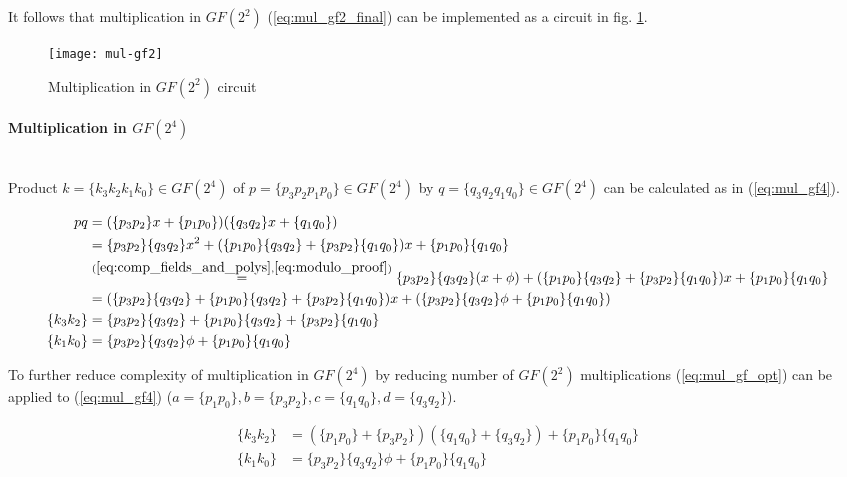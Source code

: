 It follows that multiplication in $GF(2^2)$ (\ref{eq:mul_gf2_final}) can be implemented as a circuit in fig. \ref{fig:mul_gf2}.

\begin{figure}[!h]
\centering
\texttt{[image: mul-gf2]}
\caption{Multiplication in $GF(2^2)$ circuit}
\label{fig:mul_gf2}
\end{figure}



\paragraph{Multiplication in $GF(2^4)$}\mbox{}\\
Product $k = \{k_3k_2k_1k_0\} \in GF(2^4)$ of $p = \{p_3p_2p_1p_0\} \in GF(2^4)$ by $q = \{q_3q_2q_1q_0\} \in GF(2^4)$ can be calculated as in (\ref{eq:mul_gf4}).

\begin{equation}
\label{eq:mul_gf4}
\begin{aligned}
pq &= (\{p_3p_2\}x + \{p_1p_0\})(\{q_3q_2\}x + \{q_1q_0\})\\
&= \{p_3p_2\}\{q_3q_2\}x^2 + (\{p_1p_0\}\{q_3q_2\} + \{p_3p_2\}\{q_1q_0\})x + \{p_1p_0\}\{q_1q_0\} \\
&\stackrel{(\ref{eq:comp_fields_and_polys}, \ref{eq:modulo_proof})}{=}
\{p_3p_2\}\{q_3q_2\}(x + \phi) + (\{p_1p_0\}\{q_3q_2\} + \{p_3p_2\}\{q_1q_0\})x + \{p_1p_0\}\{q_1q_0\} \\
&= (\{p_3p_2\}\{q_3q_2\} + \{p_1p_0\}\{q_3q_2\} + \{p_3p_2\}\{q_1q_0\})x + (\{p_3p_2\}\{q_3q_2\}\phi + \{p_1p_0\}\{q_1q_0\})\\
\{k_3k_2\} &= \{p_3p_2\}\{q_3q_2\} + \{p_1p_0\}\{q_3q_2\} + \{p_3p_2\}\{q_1q_0\}\\
\{k_1k_0\} &= \{p_3p_2\}\{q_3q_2\}\phi + \{p_1p_0\}\{q_1q_0\}
\end{aligned}
\end{equation}

To further reduce complexity of multiplication in $GF(2^4)$ by reducing number of $GF(2^2)$ multiplications (\ref{eq:mul_gf_opt}) can be applied to (\ref{eq:mul_gf4}) ($a = \{p_1p_0\}, b = \{p_3p_2\}, c = \{q_1q_0\}, d = \{q_3q_2\}$).

\begin{equation}
\label{eq:mul_gf4_final}
\begin{aligned}
\{k_3k_2\} &= (\{p_1p_0\} + \{p_3p_2\})(\{q_1q_0\} + \{q_3q_2\}) + \{p_1p_0\}\{q_1q_0\}\\
\{k_1k_0\} &= \{p_3p_2\}\{q_3q_2\}\phi + \{p_1p_0\}\{q_1q_0\}
\end{aligned}
\end{equation}



